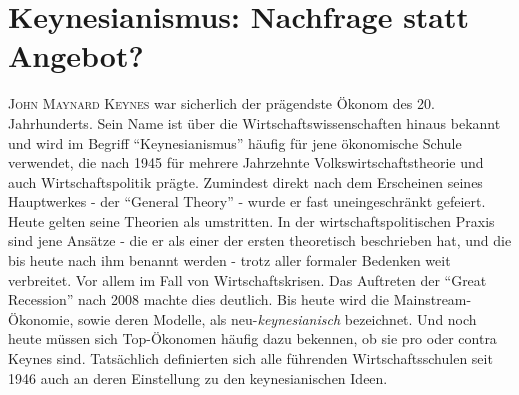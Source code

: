%
%
%

\chapter{Keynesianismus: Nachfrage statt Angebot?}
\label{Keynes}

\textsc{John Maynard Keynes} war sicherlich der prägendste Ökonom des 20. Jahrhunderts. Sein Name ist über die Wirtschaftswissenschaften hinaus bekannt und wird im Begriff "`Keynesianismus"' häufig für jene ökonomische Schule verwendet, die nach 1945 für mehrere Jahrzehnte Volkswirtschaftstheorie und auch Wirtschaftspolitik prägte. Zumindest direkt nach dem Erscheinen seines Hauptwerkes - der "`General Theory"' - wurde er fast uneingeschränkt gefeiert. Heute gelten seine Theorien als umstritten. In der wirtschaftspolitischen Praxis sind jene Ansätze - die er als einer der ersten theoretisch beschrieben hat, und die bis heute nach ihm benannt werden - trotz aller formaler Bedenken weit verbreitet. Vor allem im Fall von Wirtschaftskrisen. Das Auftreten der "`Great Recession"' nach 2008 machte dies deutlich. Bis heute wird die Mainstream-Ökonomie, sowie deren Modelle, als neu-\textit{keynesianisch} bezeichnet. Und noch heute müssen sich Top-Ökonomen häufig dazu bekennen, ob sie pro oder contra Keynes sind. Tatsächlich definierten sich alle führenden Wirtschaftsschulen seit 1946 auch an deren Einstellung zu den keynesianischen Ideen.
